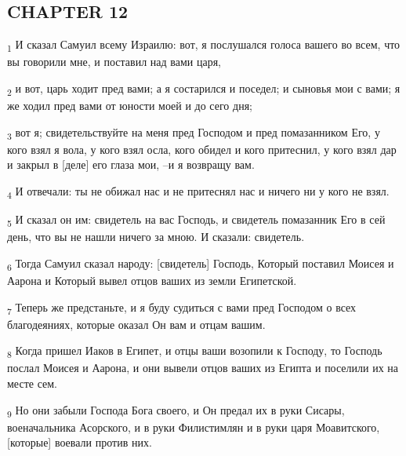 \subsection{CHAPTER 12}
\begin{tcolorbox}
\textsubscript{1} И сказал Самуил всему Израилю: вот, я послушался голоса вашего во всем, что вы говорили мне, и поставил над вами царя,
\end{tcolorbox}
\begin{tcolorbox}
\textsubscript{2} и вот, царь ходит пред вами; а я состарился и поседел; и сыновья мои с вами; я же ходил пред вами от юности моей и до сего дня;
\end{tcolorbox}
\begin{tcolorbox}
\textsubscript{3} вот я; свидетельствуйте на меня пред Господом и пред помазанником Его, у кого взял я вола, у кого взял осла, кого обидел и кого притеснил, у кого взял дар и закрыл в [деле] его глаза мои, --и я возвращу вам.
\end{tcolorbox}
\begin{tcolorbox}
\textsubscript{4} И отвечали: ты не обижал нас и не притеснял нас и ничего ни у кого не взял.
\end{tcolorbox}
\begin{tcolorbox}
\textsubscript{5} И сказал он им: свидетель на вас Господь, и свидетель помазанник Его в сей день, что вы не нашли ничего за мною. И сказали: свидетель.
\end{tcolorbox}
\begin{tcolorbox}
\textsubscript{6} Тогда Самуил сказал народу: [свидетель] Господь, Который поставил Моисея и Аарона и Который вывел отцов ваших из земли Египетской.
\end{tcolorbox}
\begin{tcolorbox}
\textsubscript{7} Теперь же предстаньте, и я буду судиться с вами пред Господом о всех благодеяниях, которые оказал Он вам и отцам вашим.
\end{tcolorbox}
\begin{tcolorbox}
\textsubscript{8} Когда пришел Иаков в Египет, и отцы ваши возопили к Господу, то Господь послал Моисея и Аарона, и они вывели отцов ваших из Египта и поселили их на месте сем.
\end{tcolorbox}
\begin{tcolorbox}
\textsubscript{9} Но они забыли Господа Бога своего, и Он предал их в руки Сисары, военачальника Асорского, и в руки Филистимлян и в руки царя Моавитского, [которые] воевали против них.
\end{tcolorbox}
